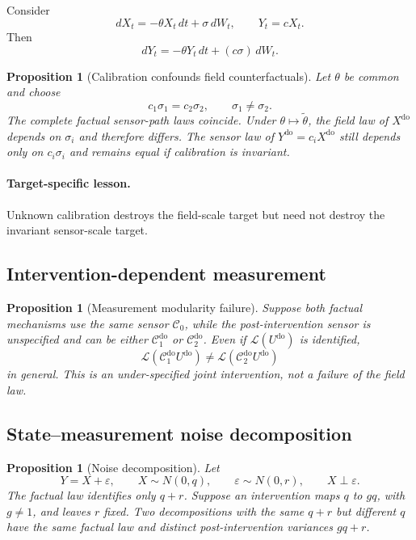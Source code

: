 \documentclass[11pt]{article}
\newtheorem{proposition}[assumption]{Proposition}
\theoremstyle{remark}
\newcommand{\cC}{\mathcal C}
\newcommand{\Law}{\mathcal L}
\newcommand{\doop}{\operatorname{do}}
\begin{document}
Consider
\[
 dX_t=-\theta X_t\,dt+\sigma\,dW_t,
 \qquad
 Y_t=cX_t.
\]
Then
\[
 dY_t=-\theta Y_t\,dt+(c\sigma)\,dW_t.
\]

\begin{proposition}[Calibration confounds field counterfactuals]\label{prop:calibration}
Let $\theta$ be common and choose
\[
 c_1\sigma_1=c_2\sigma_2,
 \qquad
 \sigma_1\neq\sigma_2.
\]
The complete factual sensor-path laws coincide. Under $\theta\mapsto\widetilde\theta$, the field law of $X^{\doop}$ depends on $\sigma_i$ and therefore differs. The sensor law of $Y^{\doop}=c_iX^{\doop}$ still depends only on $c_i\sigma_i$ and remains equal if calibration is invariant.
\end{proposition}

\paragraph{Target-specific lesson.}
Unknown calibration destroys the field-scale target but need not destroy the invariant sensor-scale target.

\subsection{Intervention-dependent measurement}

\begin{proposition}[Measurement modularity failure]\label{prop:measurement}
Suppose both factual mechanisms use the same sensor $\cC_0$, while the post-intervention sensor is unspecified and can be either $\cC_1^{\doop}$ or $\cC_2^{\doop}$. Even if $\Law(U^{\doop})$ is identified,
\[
 \Law(\cC_1^{\doop}U^{\doop})
 \neq
 \Law(\cC_2^{\doop}U^{\doop})
\]
in general. This is an under-specified joint intervention, not a failure of the field law.
\end{proposition}

\subsection{State--measurement noise decomposition}

\begin{proposition}[Noise decomposition]\label{prop:noise}
Let
\[
 Y=X+\varepsilon,
 \qquad
 X\sim N(0,q),
 \qquad
 \varepsilon\sim N(0,r),
 \qquad
 X\perp\varepsilon.
\]
The factual law identifies only $q+r$. Suppose an intervention maps $q$ to $gq$, with $g\neq1$, and leaves $r$ fixed. Two decompositions with the same $q+r$ but different $q$ have the same factual law and distinct post-intervention variances $gq+r$.
\end{proposition}
\end{document}

